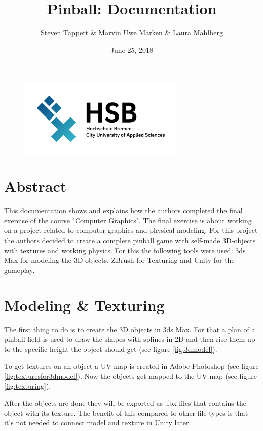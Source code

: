 \documentclass[11.5pt,oneside,a4paper]{scrartcl}
\title{Pinball: Documentation}
\author{Steven Tappert \& Marvin Uwe Marken \& Laura Mahlberg}
\date{June 25, 2018}
\newcounter{ct}
\begin{document}
\clearpage
{\let\newpage\relax\maketitle}
\thispagestyle{empty}
\vspace{20pt}

\begin{figure}
	\centering
	\includegraphics[width=8cm]{hsb.png} \\
\end{figure}

\newpage
\tableofcontents
\newpage

\section{Abstract}
This documentation shows and explains how the authors completed the final exercise of the course "Computer Graphics". The final exercise is about working on a project related to computer graphics and physical modeling. For this project the authors decided to create a complete pinball game with self-made 3D-objects with textures and working physics. For this the following tools were used: 3ds Max for modeling the 3D objects, ZBrush for Texturing and Unity for the gameplay. 

\section{Modeling \& Texturing}
The first thing to do is to create the 3D objects in 3ds Max. For that a plan of a pinball field is used to draw the shapes with splines in 2D and then rise them up to the specific height the object should get (see figure \ref{fig:3dmodel}).

To get textures on an object a UV map is created in Adobe Photoshop (see figure \ref{fig:texturesfor3dmodel}). Now the objects get mapped to the UV map (see figure \ref{fig:texturing}).

After the objects are done they will be exported as .fbx files that contains the object with its texture. The benefit of this compared to other file types is that it's not needed to connect model and texture in Unity later.
\end{document}
